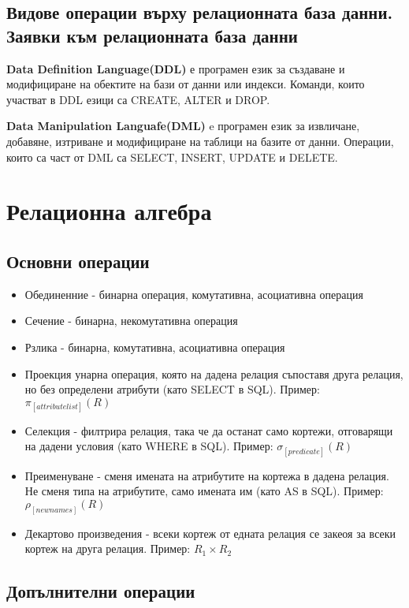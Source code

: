 \documentclass[fleqn,12pt]{article}
\begin{document}
\subsection{Видове операции върху релационната база данни. Заявки към релационната база данни}
    \textbf{Data Definition Language(DDL)} е програмен език за създаване и модифициране на обектите на бази от данни или индекси. Команди, които участват в DDL езици са CREATE, ALTER и DROP.

    \textbf{Data Manipulation Languafe(DML)} e програмен език за извличане, добавяне, изтриване и модифициране на таблици на базите от данни. Операции, които са част от DML са SELECT, INSERT, UPDATE и DELETE. 


\section{Релационна алгебра}

\subsection{Основни операции}

\begin{itemize}
    \item Обединенние - бинарна операция, комутативна, асоциативна операция
    \item Сечение - бинарна, некомутативна операция
    \item Рзлика - бинарна, комутативна, асоциативна операция
	\item Проекция унарна операция, която на дадена релация съпоставя друга релация, но без определени атрибути (като SELECT в SQL). Пример: $\pi_{[attribute list]}(R)$
    \item Селекция - филтрира релация, така че да останат само кортежи, отговарящи на дадени условия (като WHERE в SQL). Пример: $\sigma_{[predicate]}(R)$
	\item Преименуване - сменя имената на атрибутите на кортежа в дадена релация. Не сменя типа на атрибутите, само имената им (като AS в SQL). Пример: $\rho_{[new names]}(R)$
	\item Декартово произведения - всеки кортеж от едната релация се закеоя за всеки кортеж на друга релация. Пример: $R_1 \times R_2$
\end{itemize}


\subsection{Допълнителни операции}
\end{document}
